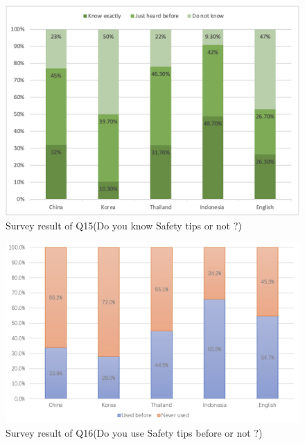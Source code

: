 \iffalse
\begin{figure}[h]
  \includegraphics[width=0.8\linewidth]{Figure/Figure13.jpg}
  \centering
  \caption[Survey result of Q15]{Survey result of Q15(Do you know Safety tips or not ?)}
  \label{fig13}
\end{figure}

\begin{figure}[h]
  \includegraphics[width=0.8\linewidth]{Figure/Figure14.jpg}
  \centering
  \caption[Survey result of Q16]{Survey result of Q16(Do you use Safety tips before or not ?)}
  \label{fig14}
\end{figure}

